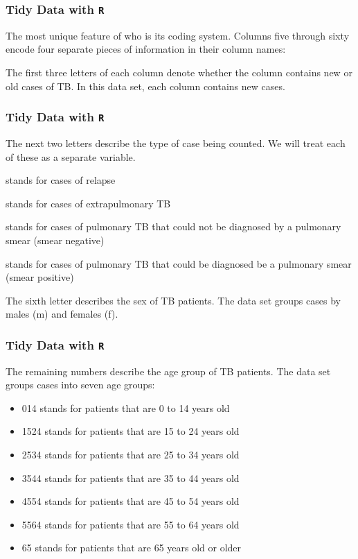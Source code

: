 \documentclass[TIDYMASTER.tex]{subfiles}
\begin{document}
\begin{frame}[fragile]
\frametitle{Tidy Data with \texttt{R}}
\Large
The most unique feature of who is its coding system. Columns five through sixty encode four separate pieces of information in their column names:

The first three letters of each column denote whether the column contains new or old cases of TB. In this data set, each column contains new cases.
\end{frame}
\begin{frame}[fragile]
\frametitle{Tidy Data with \texttt{R}}
\Large
The next two letters describe the type of case being counted. We will treat each of these as a separate variable.
\begin{description}
\item[rel] stands for cases of relapse
\item[ep] stands for cases of extrapulmonary TB
\item[sn] stands for cases of pulmonary TB that could not be diagnosed by a pulmonary smear (smear negative)
\item[sp] stands for cases of pulmonary TB that could be diagnosed be a pulmonary smear (smear positive)
\item The sixth letter describes the sex of TB patients. The data set groups cases by males (m) and females (f).
\end{description}


\end{frame}
\begin{frame}[fragile]
\frametitle{Tidy Data with \texttt{R}}
\Large
The remaining numbers describe the age group of TB patients. The data set groups cases into seven age groups:
\begin{itemize}
\item 014 stands for patients that are 0 to 14 years old
\item 1524 stands for patients that are 15 to 24 years old
\item 2534 stands for patients that are 25 to 34 years old
\item 3544 stands for patients that are 35 to 44 years old
\item 4554 stands for patients that are 45 to 54 years old
\item 5564 stands for patients that are 55 to 64 years old
\item 65 stands for patients that are 65 years old or older
\end{itemize}

\end{frame}
\end{document}
